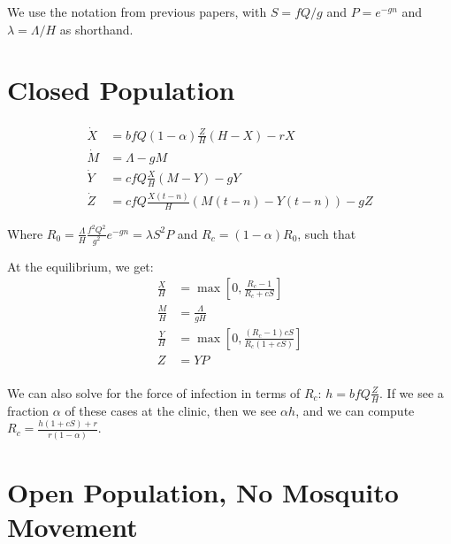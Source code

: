\documentclass{article}
\begin{document}


We use the notation from previous papers, with $S = fQ/g$ and $P = e^{-gn}$ and $\lambda = \Lambda/H$ as shorthand.  

\section{Closed Population}

\begin{equation}\begin{array}{rl}
\dot X &= b f Q (1-\alpha) \frac{\textstyle{Z}}{\textstyle{H}}(H-X) - r X \\ 
\dot M &= \Lambda - g M \\ 
\dot Y &= c f Q \frac{\textstyle{X}}{\textstyle{H}}(M-Y) - g Y \\ 
\dot Z &= c f Q \frac{\textstyle{X(t-n)}}{\textstyle{H}}(M(t-n)-Y(t-n)) - g Z
\end{array}\end{equation}

Where $R_0 =  \frac{\textstyle{\Lambda}}{\textstyle{H}}\frac{\textstyle{f^2 Q^2}}{\textstyle{g^2}}e^{-gn}= \lambda S^2 P$ and $R_c = (1-\alpha) R_0$, such that 

At the equilibrium, we get: 
\begin{equation}\begin{array}{rl}
\frac{\textstyle{X}}{\textstyle{H}} &= \max\left[0,\frac{\textstyle{R_c - 1}}{\textstyle{R_c + c S}}\right] \\
\frac{\textstyle{M}}{\textstyle{H}} &= \frac{\textstyle{\Lambda}}{\textstyle{gH}} \\
\frac{\textstyle{Y}}{\textstyle{H}} &= \max\left[0,\frac{\textstyle{\left(R_c - 1\right)cS}}{\textstyle{R_c \left(1+ c S\right)}}\right] \\
Z &= Y P \\
\end{array}\end{equation}

We can also solve for the force of infection in terms of $R_c$: $h = bfQ\frac{\textstyle{Z}}{\textstyle{H}}$.  If we see a fraction $\alpha$ of these cases at the clinic, then we see $\alpha h$, and we can compute $R_c = \frac{\textstyle{h (1+cS) + r}}{\textstyle{r(1-\alpha)}}.$ 

\section{Open Population, No Mosquito Movement}
\end{document}
